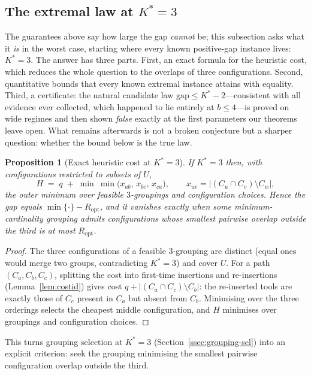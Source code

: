 \documentclass[11pt,a4paper]{article}
\theoremstyle{plain}
\newtheorem{proposition}{Proposition}
\theoremstyle{definition}
\theoremstyle{remark}
\newcommand{\U}{U}
\newcommand{\Kst}{K^{\ast}}
\begin{document}
\subsection{The extremal law at $\Kst=3$}\label{ssec:law}
The guarantees above say how large the gap \emph{cannot} be; this subsection asks
what it \emph{is} in the worst case, starting where every known positive-gap
instance lives: $\Kst=3$. The answer has three parts. First, an exact formula for
the heuristic cost, which reduces the whole question to the overlaps of three
configurations. Second, quantitative bounds that every known extremal instance
attains with equality. Third, a certificate: the natural candidate law
$\mathrm{gap}\le\Kst-2$---consistent with all evidence ever collected, which
happened to lie entirely at $b\le4$---is proved on wide regimes and then shown
\emph{false} exactly at the first parameters our theorems leave open. What
remains afterwards is not a broken conjecture but a sharper question: whether the
bound below is the true law.

\begin{proposition}[Exact heuristic cost at $\Kst=3$]\label{prop:hk3}
If $\Kst=3$ then, with configurations restricted to subsets of $\U$,
\[
  H\;=\;q\;+\;\min\ \min\bigl(x_{ab},\,x_{bc},\,x_{ca}\bigr),
  \qquad x_{uv}=\lvert(C_u\cap C_v)\setminus C_w\rvert,
\]
the outer minimum over feasible $3$-groupings and configuration choices. Hence the
gap equals $\min\{\cdot\}-R_{\mathrm{opt}}$, and it vanishes exactly when some
minimum-cardinality grouping admits configurations whose smallest pairwise overlap
outside the third is at most $R_{\mathrm{opt}}$.
\end{proposition}
\begin{proof}
The three configurations of a feasible $3$-grouping are distinct (equal ones would
merge two groups, contradicting $\Kst=3$) and cover $\U$. For a path
$(C_a,C_b,C_c)$, splitting the cost into first-time insertions and re-insertions
(Lemma~\ref{lem:costid}) gives cost $q+\lvert(C_a\cap C_c)\setminus C_b\rvert$: the
re-inserted tools are exactly those of $C_c$ present in $C_a$ but absent from
$C_b$. Minimising over the three orderings selects the cheapest middle
configuration, and $H$ minimises over groupings and configuration choices.
\end{proof}
\noindent This turns grouping selection at $\Kst=3$
(Section~\ref{ssec:grouping-sel}) into an explicit criterion: seek the grouping
minimising the smallest pairwise configuration overlap outside the third.
\end{document}
